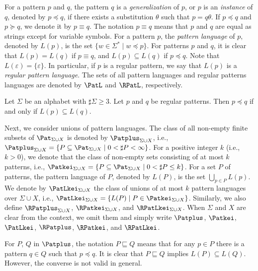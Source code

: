For a pattern $p$ and $q$,
the pattern $q$ is a \textit{generalization} of $p$, or $p$ is an \textit{instance} of $q$, denoted by $p \preceq q$,
if there exists a substitution $\theta$ such that $p = q\theta$.
If $p \preceq q$ and $p \succeq q$, we denote it by $p \equiv q$.
The notation $p \equiv q$ means that $p$ and $q$ are equal as strings except for variable symbols. 
For a pattern $p$, the \textit{pattern language} of $p$, denoted by $L(p)$, is the set $\{w \in \Sigma^{\ast} \mid w \preceq p\}$.
For patterns $p$ and $q$, it is clear that $L(p) = L(q)$ if $p \equiv q$, and $L(p) \subseteq L(q)$ if $p \preceq q$.
Note that $L(\varepsilon) = \{\varepsilon\}$.
In particular, if $p$ is a regular pattern, we say that $L(p)$ is a \textit{regular pattern language}.
The sets of all pattern languages and regular patterns languages are denoted by $\PatL$ and $\RPatL$, respectively.

\begin{lem}\label{regularPatternEquivalence}
  Let $\Sigma$ be an alphabet with $\sharp \Sigma \geq 3$. Let $p$ and $q$ be regular patterns.
  Then $p \preceq q$ if and only if $L(p) \subseteq L(q)$.
\end{lem}

Next, we consider unions of pattern languages. 
The class of all non-empty finite subsets of {\color{black}$\Pat_{\Sigma\cup X}$} is denoted by {\color{black}$\Patplus_{\Sigma\cup X}$}, i.e.,
{\color{black}$\Patplus_{\Sigma\cup X} = \{P \subseteq \Pat_{\Sigma \cup X} \mid 0 < \sharp P < \infty\}$}.
For a positive integer $k$ (i.e., $k>0$), 
we denote that the class of non-empty sets consisting of at most $k$ patterns, i.e.,
{\color{black}$\Patkei_{\Sigma\cup X} = \{P \subseteq \Pat_{\Sigma\cup X} \mid 0< \sharp P \leq k\}$}.
For a set $P$ of patterns, the pattern language of $P$, denoted by $L(P)$, is the set $\bigcup_{p \in P}L(p)$.
We denote by $\PatLkei_{\Sigma\cup X}$ the class of unions of at most $k$ pattern languages {\color{black}over $\Sigma\cup X$},
i.e., {\color{black}$\PatLkei_{\Sigma\cup X} = \{L(P) \mid P \in \Patkei_{\Sigma\cup X}\}$}.
{\color{black}Similarly}, we also define $\RPatplus_{\Sigma\cup X}$, $\RPatkei_{\Sigma\cup X}$, and $\RPatLkei_{\Sigma\cup X}$.
{\color{black} When $\Sigma$ and $X$ are clear from the context, we omit them and simply write $\Patplus$, $\Patkei$, $\PatLkei$, $\RPatplus$, $\RPatkei$, and $\RPatLkei$.}

For $P$, $Q$ in $\Patplus$,
the notation $P \sqsubseteq Q$ means that for any $p \in P$ there is a pattern $q \in Q$ such that $p \preceq q$.
It is clear that $P \sqsubseteq Q$ implies $L(P) \subseteq L(Q)$.
However, the converse is not valid in general.